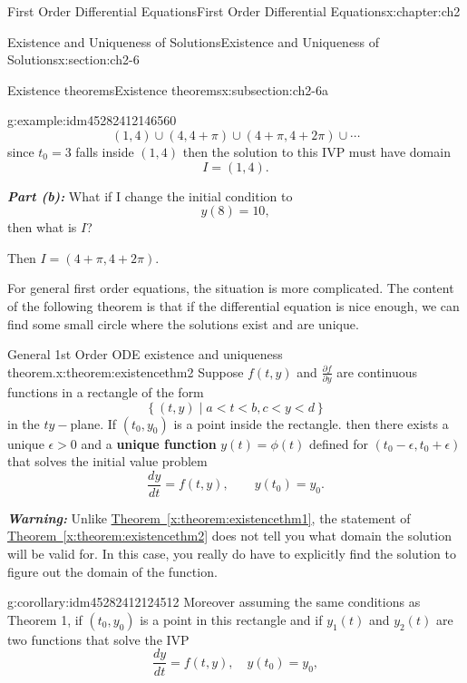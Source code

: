 \documentclass[oneside,10pt,]{book}
\newcommand{\alert}[1]{\textbf{\textit{#1}}}
\newcommand{\terminology}[1]{\textbf{#1}}
\numberwithin{equation}{section}
\numberwithin{equation}{section}
\newcommand{\lt}{<}
\begin{document}
\begin{chapterptx}{First Order Differential Equations}{}{First Order Differential Equations}{}{}{x:chapter:ch2}
\begin{sectionptx}{Existence and Uniqueness of Solutions}{}{Existence and Uniqueness of Solutions}{}{}{x:section:ch2-6}
\begin{subsectionptx}{Existence theorems}{}{Existence theorems}{}{}{x:subsection:ch2-6a}
\begin{example}{}{g:example:idm45282412146560}
\begin{equation*}
\left(1,4\right)\cup\left(4,4+\pi\right)\cup\left(4+\pi,4+2\pi\right)\cup\cdots
\end{equation*}
since \(t_{0}=3\) falls inside \((1,4)\) then the solution to this IVP must have domain%
\begin{equation*}
I=(1,4).
\end{equation*}
%
\par
\alert{Part (b):} What if I change the initial condition to%
\begin{equation*}
y(8)=10,
\end{equation*}
then what is \(I\)?%
\par
Then \(I=\left(4+\pi,4+2\pi\right)\).%
\end{example}
For general first order equations, the situation is more complicated. The content of the following theorem is that if the differential equation is nice enough, we can find some small circle where the solutions exist and are unique.%
\begin{theorem}{General 1st Order ODE existence and uniqueness theorem.}{}{x:theorem:existencethm2}%
Suppose \(f(t,y)\) and \(\frac{\partial f}{\partial y}\) are continuous functions in a rectangle of the form%
\begin{equation*}
\left\{ \left(t,y\right)\mid a\lt t\lt b,c \lt y \lt d\right\}
\end{equation*}
in the \(ty-\)plane. If \((t_{0},y_{0})\) is a point inside the rectangle. then there exists a unique \(\epsilon>0\) and a \terminology{unique function} \(y(t)=\phi(t)\) defined for \(\left(t_{0}-\epsilon,t_{0}+\epsilon\right)\) that solves the initial value problem%
\begin{equation*}
\frac{dy}{dt}=f(t,y),\qquad y(t_{0})=y_{0}.
\end{equation*}
%
\end{theorem}
\alert{Warning:} Unlike \hyperref[x:theorem:existencethm1]{Theorem~\ref{x:theorem:existencethm1}}, the statement of \hyperref[x:theorem:existencethm2]{Theorem~\ref{x:theorem:existencethm2}} does not tell you what domain the solution will be valid for. In this case, you really do have to explicitly find the solution to figure out the domain of the function.%
\begin{corollary}{}{}{g:corollary:idm45282412124512}%
Moreover assuming the same conditions as Theorem 1, if \((t_{0},y_{0})\) is a point in this rectangle and if \(y_{1}(t)\) and \(y_{2}(t)\) are two functions that solve the IVP%
\begin{equation*}
\frac{dy}{dt}=f(t,y),\quad y(t_{0})=y_{0},

\end{equation*}
\end{corollary}
\end{subsectionptx}
\end{sectionptx}
\end{chapterptx}
\end{document}

